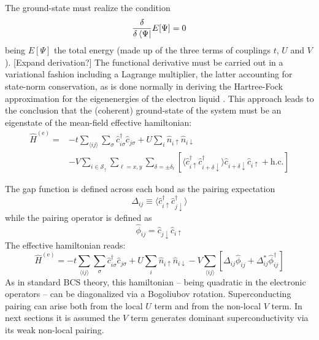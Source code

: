 The ground-state must realize the condition
\[
	\fdv{}{\bra{\Psi}} E[\Psi] = 0
\]
being $E[\Psi]$ the total energy (made up of the three terms of couplings $t$, $U$ and $V$). {\color{tabred}[Expand derivation?]} The functional derivative must be carried out in a variational fashion including a Lagrange multiplier, the latter accounting for state-norm conservation, as is done normally in deriving the Hartree-Fock approximation for the eigenenergies of the electron liquid \cite{grosso2014solid, giuliani2005quantum}. This approach leads to the conclusion that the (coherent) ground-state of the system must be an eigenstate of the mean-field effective hamiltonian:
\begin{equation}\label{eq:extended-hubbard-model-effective-intermediate}
	\begin{aligned}
		\hat H^{(\mathrm{e})} =
		&-t \sum_{\langle ij \rangle} \sum_\sigma \hat c_{i\sigma}^\dagger \hat c_{j\sigma}
		+ U \sum_i \hat n_{i\uparrow} \hat n_{i\downarrow} \\
		&- V \sum_{i \in \mathcal{S}_\uparrow} \sum_{\ell = x,y} \sum_{\delta = \pm \delta_\ell} \left[
			\langle 
				\hat c_{i\uparrow}^\dagger \hat c_{i + \delta \downarrow}^\dagger
			\rangle
			\hat c_{i + \delta \downarrow} \hat c_{i\uparrow} 
			+ \mathrm{h}.\mathrm{c}.
		\right]
	\end{aligned}
\end{equation}

The gap function is defined across each bond as the pairing expectation
\[
	\Delta_{ij} \equiv \langle 
		\hat c_{i\uparrow}^\dagger \hat c_{j \downarrow}^\dagger
	\rangle
\]
while the pairing operator is defined as
\[
	\hat \phi_{ij} = \hat c_{j\downarrow} \hat c_{i\uparrow}
\]
The effective hamiltonian reads:
\begin{equation}\label{eq:extended-hubbard-model-effective}
	\hat H^{(\mathrm{e})} =
	-t \sum_{\langle ij \rangle} \sum_\sigma \hat c_{i\sigma}^\dagger \hat c_{j\sigma}
	+ U \sum_i \hat n_{i\uparrow} \hat n_{i\downarrow}
	- V \sum_{\langle ij \rangle} \left[
		\Delta_{ij} \hat \phi_{ij} + \Delta_{ij}^* \hat \phi_{ij}^\dagger
	\right]
\end{equation}
As in standard $\mathrm{BCS}$ theory, this hamiltonian -- being quadratic in the electronic operators -- can be diagonalized via a Bogoliubov rotation. Superconducting pairing can arise both from the local $U$ term and from the non-local $V$ term. In next sections it is assumed the $V$ term generates dominant superconductivity via its weak non-local pairing.

